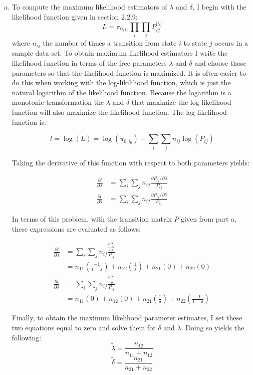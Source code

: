\documentclass{homework}
\newcommand{\fracpd}[2]{
    \ensuremath{\frac{\partial #1}{\partial #2}}
  }
\newcommand{\pfrac}[2]{
    \ensuremath{ \left( \frac{#1}{#2} \right)}
  }
\begin{document}
\begin{homeworkProblem}
{\begin{enumerate}[a.]
      \item To compute the maximum likelihood estimators of $\lambda$ and $\delta$, I begin with the likelihood function given in section 2.2.9:
        $$L = \pi_{0, i_0} \prod_i \prod_j P_{ij}^{n_{ij}}$$
        where $n_{ij}$ the number of times a transition from state $i$ to state $j$ occurs in a sample data set. To obtain maximum likelihood estimators I write the likelihood function in terms of the free parameters $\lambda$ and $\delta$ and choose those parameters so that the likelihood function is maximized. It is often easier to do this when working with the log-likilihood function, which is just the natural logarithm of the likelihood function. Because the logarithm is a monotonic transformation the $\lambda$ and $\delta$ that maximize the log-likelihood function will also maximize the likelihood function. The log-likelihood function is:

        $$l = \log(L) = \log(\pi_{0, i_0}) + \sum_i \sum_j n_{ij} \log(P_{ij}) $$

        Taking the derivative of this function with respect to both parameters yields:

        \begin{align*}
          \fracpd{l}{\lambda} &= \sum_i \sum_j n_{ij} \frac{\partial P_{ij} / \partial \lambda}{P_{ij}} \\
          \fracpd{l}{\delta} &= \sum_i \sum_j n_{ij} \frac{\partial P_{ij} / \partial \delta}{P_{ij}}
        \end{align*}

        In terms of this problem, with the transition matrix $P$ given from part a, these expressions are evaluated as follows:

        \begin{align*}
          \fracpd{l}{\lambda} &= \sum_i \sum_j n_{ij} \frac{\fracpd{P_{ij}}{\lambda}}{P_{ij}} \\
            &= n_{11} \pfrac{-1}{1 - \lambda} + n_{12} \pfrac{1}{\lambda}+ n_{21}(0) + n_{22}(0) \\
          \fracpd{l}{\delta} &= \sum_i \sum_j n_{ij} \frac{\fracpd{P_{ij}}{\delta}}{P_{ij}} \\
            &= n_{11} (0) + n_{12} (0) + n_{21} \pfrac{1}{\delta}+ n_{22} \pfrac{-1}{1 - \delta}
        \end{align*}

        Finally, to obtain the maximum likelihood parameter estimates, I set these two equations equal to zero and solve them for $\delta$ and $\lambda$. Doing so yields the following:
          $$\tilde{\lambda} = \frac{n_{12}}{n_{11}+n_{12}}$$
          $$\tilde{\delta} = \frac{n_{21}}{n_{21}+n_{22}}$$


\end{enumerate}}
\end{homeworkProblem}
\end{document}
